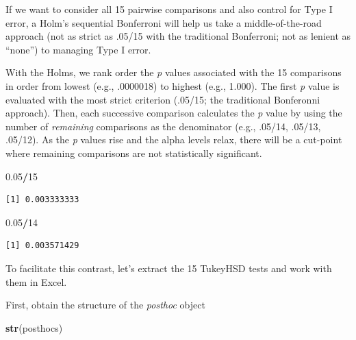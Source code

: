 \documentclass[
  11pt,
]{book}
\newenvironment{Shaded}{\begin{snugshade}}{\end{snugshade}}
\newcommand{\DecValTok}[1]{\textcolor[rgb]{0.06,0.06,0.06}{#1}}
\newcommand{\FloatTok}[1]{\textcolor[rgb]{0.06,0.06,0.06}{#1}}
\newcommand{\FunctionTok}[1]{\textcolor[rgb]{0.27,0.27,0.27}{\textbf{#1}}}
\newcommand{\NormalTok}[1]{#1}
\newcommand{\SpecialCharTok}[1]{\textcolor[rgb]{0.43,0.43,0.43}{\textbf{#1}}}
\begin{document}
If we want to consider all 15 pairwise comparisons and also control for Type I error, a Holm's sequential Bonferroni \citep{green_using_2017} will help us take a middle-of-the-road approach (not as strict as .05/15 with the traditional Bonferroni; not as lenient as ``none'') to managing Type I error.

With the Holms, we rank order the \emph{p} values associated with the 15 comparisons in order from lowest (e.g., .0000018) to highest (e.g., 1.000). The first \emph{p} value is evaluated with the most strict criterion (.05/15; the traditional Bonferonni approach). Then, each successive comparison calculates the \emph{p} value by using the number of \emph{remaining} comparisons as the denominator (e.g., .05/14, .05/13, .05/12). As the \emph{p} values rise and the alpha levels relax, there will be a cut-point where remaining comparisons are not statistically significant.

\begin{Shaded}
\begin{Highlighting}[]
\FloatTok{0.05}\SpecialCharTok{/}\DecValTok{15}
\end{Highlighting}
\end{Shaded}

\begin{verbatim}
[1] 0.003333333
\end{verbatim}

\begin{Shaded}
\begin{Highlighting}[]
\FloatTok{0.05}\SpecialCharTok{/}\DecValTok{14}
\end{Highlighting}
\end{Shaded}

\begin{verbatim}
[1] 0.003571429
\end{verbatim}

To facilitate this contrast, let's extract the 15 TukeyHSD tests and work with them in Excel.

First, obtain the structure of the \emph{posthoc} object

\begin{Shaded}
\begin{Highlighting}[]
\FunctionTok{str}\NormalTok{(posthocs)}
\end{Highlighting}
\end{Shaded}
\end{document}
